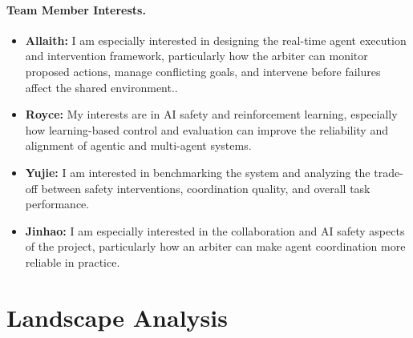 \documentclass[11pt]{article}
\begin{document}
\paragraph{Team Member Interests.}
\begin{itemize}

    \item \textbf{Allaith:} I am especially interested in designing the real-time agent execution and intervention framework, particularly how the arbiter can monitor proposed actions, manage conflicting goals, and intervene before failures affect the shared environment..

    \item \textbf{Royce:} My interests are in AI safety and reinforcement learning, especially how learning-based control and evaluation can improve the reliability and alignment of agentic and multi-agent systems.

    \item \textbf{Yujie:} I am interested in benchmarking the
    system and analyzing the trade-off between safety interventions,
    coordination quality, and overall task performance.
    
    \item \textbf{Jinhao:} I am especially interested in the collaboration and AI safety aspects of the project, particularly how an arbiter can make agent coordination more reliable in practice.
\end{itemize}
\vspace{-1.5em}


\section{Landscape Analysis}

\small
\renewcommand{\arraystretch}{1.2}
\end{document}
